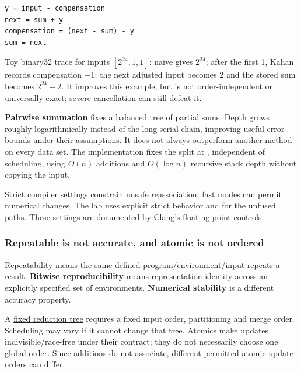 \begin{verbatim}
y = input - compensation
next = sum + y
compensation = (next - sum) - y
sum = next
\end{verbatim}

Toy binary32 trace for inputs \([2^{24},1,1]\): naive gives \(2^{24}\); after the first 1, Kahan records compensation −1; the next adjusted input becomes 2 and the stored sum becomes \(2^{24}+2\). It improves this example, but is not order-independent or universally exact; severe cancellation can still defeat it.

\textbf{Pairwise summation} fixes a balanced tree of partial sums. Depth grows roughly logarithmically instead of the long serial chain, improving useful error bounds under their assumptions. It does not always outperform another method on every data set. The implementation fixes the split at , independent of scheduling, using \(O(n)\) additions and \(O(\log n)\) recursive stack depth without copying the input.

Strict compiler settings constrain unsafe reassociation; fast modes can permit numerical changes. The lab uses explicit strict behavior and  for the unfused paths. These settings are documented by \href{https://clang.llvm.org/docs/UsersManual.html\#controlling-floating-point-behavior}{Clang's floating-point controls}.

\subsubsection{Repeatable is not accurate, and atomic is not ordered}\label{01-foundations-i-ch001-repeatable-is-not-accurate-and-atomic-is-not-ordered}

\hypertarget{01-foundations-i-ch001-repeatable-is-not-accurate-and-atomic-is-not-ordered}{}

\hyperref[appendix-5f1a2c3f97ff]{Repeatability} means the same defined program/environment/input repeats a result. \textbf{Bitwise reproducibility} means representation identity across an explicitly specified set of environments. \textbf{Numerical stability} is a different accuracy property.

A \hyperref[appendix-4c8e0238e7ee]{fixed reduction tree} requires a fixed input order, partitioning and merge order. Scheduling may vary if it cannot change that tree. Atomics make updates indivisible/race-free under their contract; they do not necessarily choose one global order. Since additions do not associate, different permitted atomic update orders can differ.


